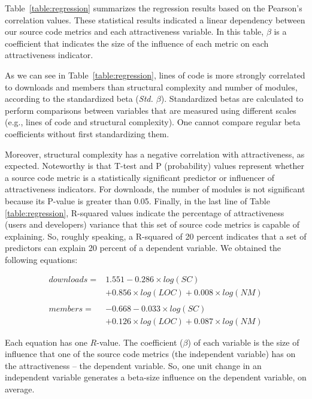 \documentclass[conference]{IEEEtran}
\begin{document}
Table~\ref{table:regression} summarizes the regression results based on the
Pearson's correlation values.
%
These statistical results indicated a linear dependency between our
source code metrics and each attractiveness variable.
%
In this table, $\beta$ is a coefficient that indicates the
size of the influence of each metric on each attractiveness indicator.

As we can see in Table~\ref{table:regression}, lines of code is more strongly
correlated to downloads and members than structural complexity and number of modules,
according to the standardized beta (\emph{Std. $\beta$}). 
%
Standardized betas are calculated to perform comparisons between variables that
are measured using different scales (e.g., lines of code and structural complexity).
One cannot compare regular beta coefficients without first standardizing them.

Moreover, structural complexity has a negative correlation with attractiveness,
as expected. Noteworthy is that T-test and P (probability) values represent whether a source code
metric is a statistically significant predictor or influencer of attractiveness indicators.
%
For downloads, the number of modules is not significant because
its P-value is greater than 0.05. 
%
Finally, in the last line of Table \ref{table:regression}, R-squared values
indicate the percentage of attractiveness (users and developers) variance that
this set of source code metrics is capable of explaining. 
%
So, roughly speaking, a R-squared of 20 percent indicates that a set of
predictors can explain 20 percent of a dependent variable.
%
We obtained the following equations:

\begin{displaymath}
\begin{array}{lll}
downloads = & 1.551 - 0.286\times log(SC) \\
            & + 0.856\times log(LOC) + 0.008\times log(NM) \\
\\
members = & -0.668 - 0.033\times log(SC) \\
            & + 0.126\times log(LOC) + 0.087\times log(NM)
\end{array}
\end{displaymath}

Each equation has one $R$-value. The coefficient ($\beta$) of each variable is
the size of influence that one of the source code metrics (the independent variable)
has on the attractiveness -- the dependent variable.
%
So, one unit change in an independent
variable generates a beta-size influence on the dependent variable, on average.
\end{document}
